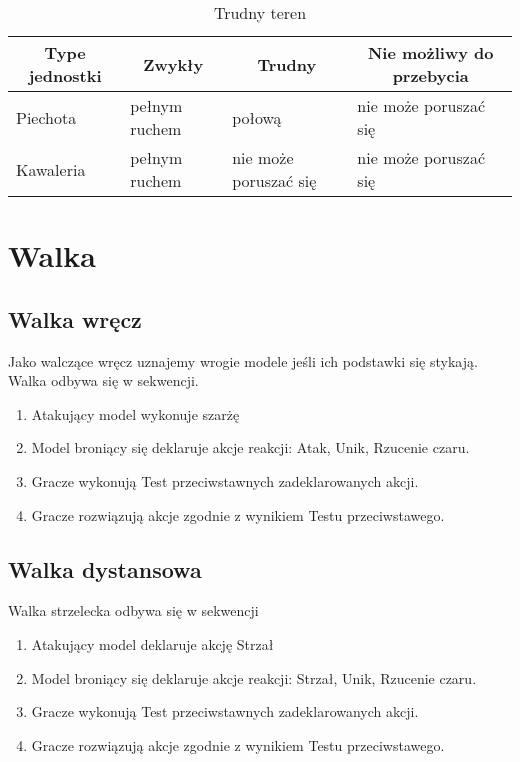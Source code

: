 \begin{table}[h]
\caption{Trudny teren}
\begin{tabular}{|l|l|l|l|}
\hline
\multicolumn{1}{c}{Type jednostki} & \multicolumn{1}{c}{Zwykły} & \multicolumn{1}{c}{Trudny} & \multicolumn{1}{c}{Nie możliwy do przebycia} \\ \hline
Piechota & pełnym ruchem & połową & nie może poruszać się \\ \hline
Kawaleria & pełnym ruchem & nie może poruszać się & nie może poruszać się \\ \hline
\end{tabular}

\end{table}


\section{Walka}
\subsection{Walka wręcz}
Jako walczące wręcz uznajemy wrogie modele jeśli ich podstawki się stykają. Walka odbywa się w sekwencji.
\begin{enumerate}
    \item Atakujący model wykonuje szarżę
    \item Model broniący się deklaruje akcje reakcji: Atak, Unik, Rzucenie czaru. 
    \item Gracze wykonują Test przeciwstawnych zadeklarowanych akcji.
    \item Gracze rozwiązują akcje zgodnie z wynikiem Testu przeciwstawego. 
\end{enumerate}
\subsection{Walka dystansowa}
Walka strzelecka odbywa się w sekwencji
\begin{enumerate}
    \item Atakujący model deklaruje akcję Strzał
    \item Model broniący się deklaruje akcje reakcji: Strzał, Unik, Rzucenie czaru. 
    \item Gracze wykonują Test przeciwstawnych zadeklarowanych akcji.
    \item Gracze rozwiązują akcje zgodnie z wynikiem Testu przeciwstawego. 
\end{enumerate}

